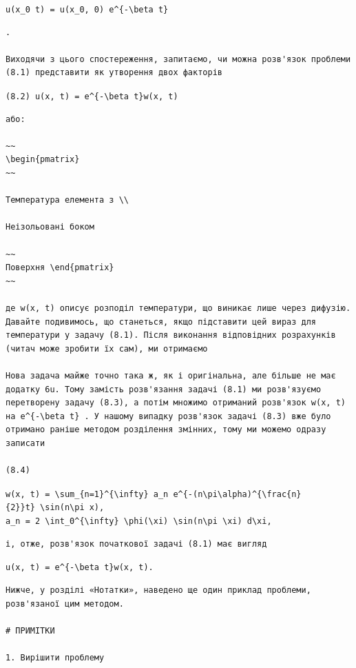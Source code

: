 \documentclass[
  ukrainian,
]{article}
\begin{document}
\texttt{u(x\_0\ t)\ =\ u(x\_0,\ 0)\ e\^{}\{-\textbackslash{}beta\ t\}}

\begin{verbatim}
.

Виходячи з цього спостереження, запитаємо, чи можна розв'язок проблеми (8.1) представити як утворення двох факторів
\end{verbatim}

\texttt{(8.2)\ u(x,\ t)\ =\ e\^{}\{-\textbackslash{}beta\ t\}w(x,\ t)}

\begin{verbatim}
або:

~~
\begin{pmatrix}
~~

Температура елемента з \\

Неізольовані боком

~~
Поверхня \end{pmatrix}
~~

де w(x, t) описує розподіл температури, що виникає лише через дифузію. Давайте подивимось, що станеться, якщо підставити цей вираз для температури у задачу (8.1). Після виконання відповідних розрахунків (читач може зробити їх сам), ми отримаємо

Нова задача майже точно така ж, як і оригінальна, але більше не має додатку 6u. Тому замість розв'язання задачі (8.1) ми розв'язуємо перетворену задачу (8.3), а потім множимо отриманий розв'язок w(x, t) на e^{-\beta t} . У нашому випадку розв'язок задачі (8.3) вже було отримано раніше методом розділення змінних, тому ми можемо одразу записати

(8.4)
\end{verbatim}

\texttt{w(x,\ t)\ =\ \textbackslash{}sum\_\{n=1\}\^{}\{\textbackslash{}infty\}\ a\_n\ e\^{}\{-(n\textbackslash{}pi\textbackslash{}alpha)\^{}\{\textbackslash{}frac\{n\}\{2\}\}t\}\ \textbackslash{}sin(n\textbackslash{}pi\ x),}
\texttt{a\_n\ =\ 2\ \textbackslash{}int\_0\^{}\{\textbackslash{}infty\}\ \textbackslash{}phi(\textbackslash{}xi)\ \textbackslash{}sin(n\textbackslash{}pi\ \textbackslash{}xi)\ d\textbackslash{}xi,}

\begin{verbatim}
і, отже, розв'язок початкової задачі (8.1) має вигляд
\end{verbatim}

\texttt{u(x,\ t)\ =\ e\^{}\{-\textbackslash{}beta\ t\}w(x,\ t).}

\begin{verbatim}
Нижче, у розділі «Нотатки», наведено ще один приклад проблеми, розв'язаної цим методом.

# ПРИМІТКИ

1. Вирішити проблему
\end{verbatim}
\end{document}
